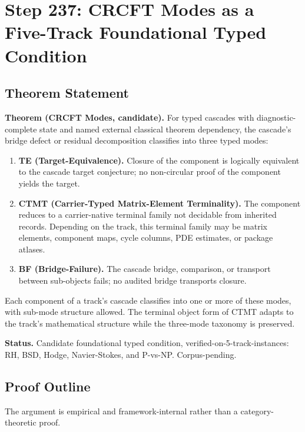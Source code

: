 \section*{Step 237: CRCFT Modes as a Five-Track Foundational Typed Condition}

\subsection*{Theorem Statement}

\textbf{Theorem (CRCFT Modes, candidate).}
For typed cascades with diagnostic-complete state and named external classical theorem dependency, the cascade's bridge defect or residual decomposition classifies into three typed modes:

\begin{enumerate}
  \item \textbf{TE (Target-Equivalence).} Closure of the component is logically equivalent to the cascade target conjecture; no non-circular proof of the component yields the target.
  \item \textbf{CTMT (Carrier-Typed Matrix-Element Terminality).} The component reduces to a carrier-native terminal family not decidable from inherited records. Depending on the track, this terminal family may be matrix elements, component maps, cycle columns, PDE estimates, or package atlases.
  \item \textbf{BF (Bridge-Failure).} The cascade bridge, comparison, or transport between sub-objects fails; no audited bridge transports closure.
\end{enumerate}

Each component of a track's cascade classifies into one or more of these modes, with sub-mode structure allowed. The terminal object form of CTMT adapts to the track's mathematical structure while the three-mode taxonomy is preserved.

\textbf{Status.} Candidate foundational typed condition, verified-on-5-track-instances: RH, BSD, Hodge, Navier-Stokes, and P-vs-NP. Corpus-pending.

\subsection*{Proof Outline}

The argument is empirical and framework-internal rather than a category-theoretic proof.

